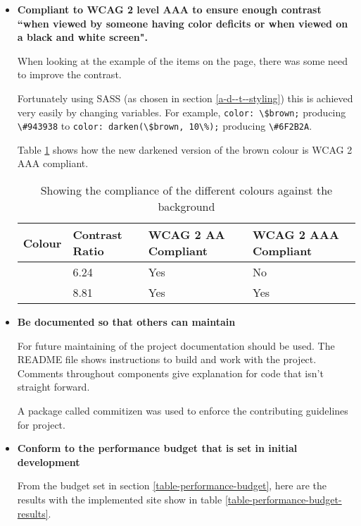 \begin{itemize}
  \item \textbf{Compliant to WCAG 2 level AAA to ensure enough contrast ``when viewed by someone having color deficits or when viewed on a black and white screen". \cite{colour_contrast}}

    When looking at the example of the items on the page, there was some need to improve the contrast.

    Fortunately using SASS (as chosen in section \ref{a-d--t--styling}) this is achieved very easily by changing variables. For example, \verb|color: \$brown;| producing \verb|\#943938| to \verb|color: darken(\$brown, 10\%);| producing \verb|\#6F2B2A|.

    Table \ref{table-contrast-changes} shows how the new darkened version of the brown colour is WCAG 2 AAA compliant.

    \begin{table}[H]
    \centering
    \begin{tabular}{|l|l|l|l|}
    \hline
    \textbf{Colour} & \textbf{Contrast Ratio} & \textbf{WCAG 2 AA Compliant} & \textbf{WCAG 2 AAA Compliant} \\ \hline
    \cellcolor[HTML]{943938}{\color[HTML]{FFFFFF} \textbf{\#943938}} & 6.24 & Yes & No                       \\ \hline
    \cellcolor[HTML]{6F2B2A}{\color[HTML]{FFFFFF} \textbf{\#6F2B2A}} & 8.81 & Yes & Yes                      \\ \hline
    \end{tabular}
    \caption{Showing the compliance of the different colours against the background}
    \label{table-contrast-changes}
    \end{table}

  \item \textbf{Be documented so that others can maintain}

    For future maintaining of the project documentation should be used. The README file shows instructions to build and work with the project. Comments throughout components give explanation for code that isn't straight forward.

    A package called commitizen was used to enforce the contributing guidelines for project. \cite{commitizen}

  \item \textbf{Conform to the performance budget that is set in initial development}

    From the budget set in section \ref{table-performance-budget}, here are the results with the implemented site show in table \ref{table-performance-budget-results}.


\end{itemize}

